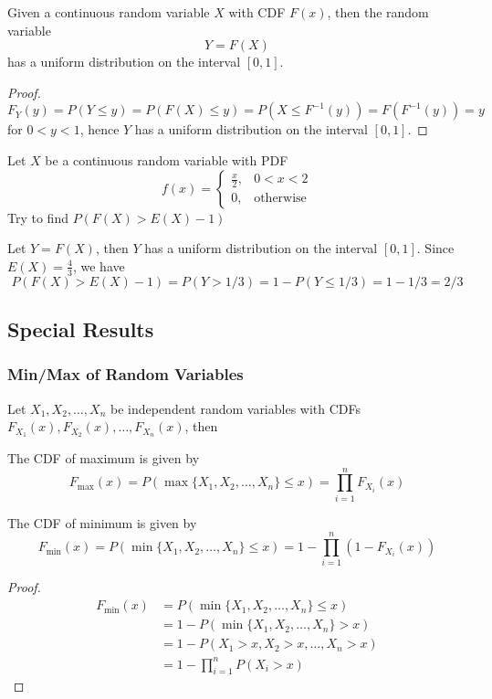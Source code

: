 \documentclass{template}
\begin{document}
\begin{theorem}
	Given a continuous random variable \( X \) with CDF \( F(x) \), then the random variable
	\[
		Y = F(X)
	\] 
	has a uniform distribution on the interval \( [0, 1] \).
	\begin{proof}
		\[
			F_Y(y) = P(Y \leq y) = P(F(X) \leq y) = P(X \leq F^{-1}(y)) = F(F^{-1}(y)) = y
		\] 
		for $0<y<1$, hence $Y$ has a uniform distribution on the interval $[0, 1]$.
	\end{proof}
\end{theorem}
\begin{example}
	Let $X$ be a continuous random variable with PDF
	\[
	f(x) = \begin{cases}
		\frac{x}{2}, & 0<x<2 \\
		0, & \text{otherwise}
	\end{cases}
	\] 
	Try to find $P(F(X)>E(X)-1)$
	\begin{answer}
		Let $Y=F(X)$, then $Y$ has a uniform distribution on the interval $[0, 1]$.
		Since $E(X)=\frac{4}{3}$, we have
		\[
		P(F(X)>E(X)-1) = P(Y>1/3) = 1-P(Y\leq 1/3) = 1-1/3 = 2/3
		\]
	\end{answer}
	
\end{example}

\subsection{Special Results}
\subsubsection{Min/Max of Random Variables}

Let \( X_1, X_2, \ldots, X_n \) be independent random variables with CDFs \( F_{X_1}(x), 
F_{X_2}(x), \ldots, F_{X_n}(x) \), then

\begin{theorem}
	The CDF of maximum is given by
	\[
		F_{\max}(x) = P(\max\{X_1, X_2, \ldots, X_n\} \leq x) = \prod_{i=1}^{n} F_{X_i}(x)
	\] 
\end{theorem}
\begin{theorem}
	The CDF of minimum is given by
	\[
		F_{\min}(x) = P(\min\{X_1, X_2, \ldots, X_n\} \leq x) = 1 - \prod_{i=1}^{n} (1-F_{X_i}(x))
	\]
	\begin{proof}
		\[
		\begin{aligned}
			F_{\min}(x) &= P(\min\{X_1, X_2, \ldots, X_n\} \leq x) \\
			&= 1 - P(\min\{X_1, X_2, \ldots, X_n\} > x) \\
			&= 1 - P(X_1 > x, X_2 > x, \ldots, X_n > x) \\
			&= 1 - \prod_{i=1}^{n} P(X_i > x) 
		\end{aligned}
		\] 
	\end{proof}
\end{theorem}
\end{document}
